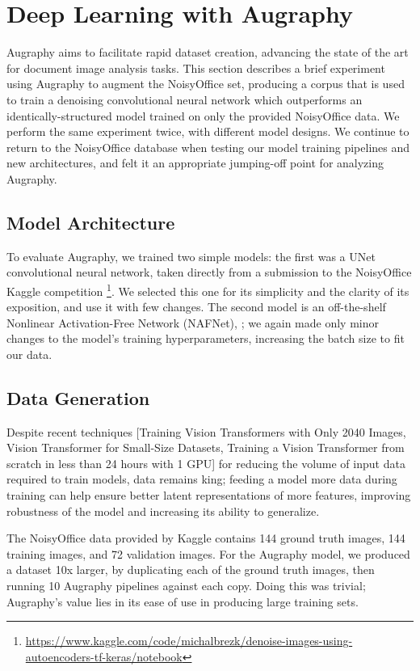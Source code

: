 \documentclass[runningheads]{llncs}
\begin{document}
\section{Deep Learning with Augraphy}
Augraphy aims to facilitate rapid dataset creation, advancing the state of the art for document image analysis tasks.
This section describes a brief experiment using Augraphy to augment the NoisyOffice set, producing a corpus that is used to train a denoising convolutional neural network which outperforms an identically-structured model trained on only the provided NoisyOffice data. We perform the same experiment twice, with different model designs.
We continue to return to the NoisyOffice database when testing our model training pipelines and new architectures, and felt it an appropriate jumping-off point for analyzing Augraphy.

\subsection{Model Architecture}
To evaluate Augraphy, we trained two simple models: the first was a UNet convolutional neural network, taken directly from a submission to the NoisyOffice Kaggle competition  \footnote{\url{https://www.kaggle.com/code/michalbrezk/denoise-images-using-autoencoders-tf-keras/notebook}}. We selected this one for its simplicity and the clarity of its exposition, and use it with few changes. The second model is an off-the-shelf Nonlinear Activation-Free Network (NAFNet), \cite{ref_nafnet}; we again made only minor changes to the model's training hyperparameters, increasing the batch size to fit our data.

\subsection{Data Generation}
Despite recent techniques [Training Vision Transformers with Only 2040 Images, Vision Transformer for Small-Size Datasets, Training a Vision Transformer from scratch in less than 24 hours with 1 GPU] for reducing the volume of input data required to train models, data remains king; feeding a model more data during training can help ensure better latent representations of more features, improving robustness of the model and increasing its ability to generalize.

The NoisyOffice data provided by Kaggle contains 144 ground truth images, 144 training images, and 72 validation images.
For the Augraphy model, we produced a dataset 10x larger, by duplicating each of the ground truth images, then running 10 Augraphy pipelines against each copy.
Doing this was trivial; Augraphy's value lies in its ease of use in producing large training sets.
\end{document}
